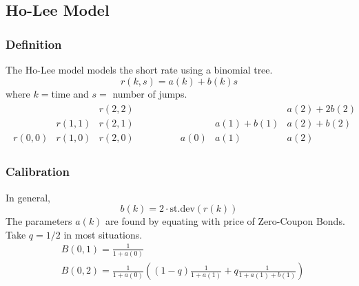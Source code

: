 \documentclass[11pt]{article}
\begin{document}
	\subsection{Ho-Lee Model}
	\subsubsection{Definition}
	The Ho-Lee model models the short rate using a binomial tree. 
	\[	r(k, s) = a(k) + b(k) s
		\]
	where \( k = \)time and \( s =  \) number of jumps. 
	\begin{align*}
		\begin{matrix}
		  	& & r(2,2)\\
			& r(1, 1) & r(2,1)\\
		r(0, 0)	& r(1, 0) & r(2,0)
		\end{matrix}
		\qquad\qquad
		\begin{matrix}
			& & a(2) + 2b(2)\\
			& a(1) + b(1) & a(2) +b(2)\\
			a(0) & a(1) & a(2)
		\end{matrix}
	\end{align*}
	\subsubsection{Calibration}
	In general,
	\[	b(k) = 2\cdot \text{st.dev}(r(k))
		\]
	The parameters \( a(k) \) are found by equating with price of Zero-Coupon Bonds. Take \( q = 1/2 \) in most situations.
	\begin{align*}
			& B(0, 1) = \frac{1}{1+a(0)}\\[3pt]
			& B(0,2) = \frac{1}{1+a(0)}\left((1 - q)\frac{1}{1 + a(1)} + q\frac{1}{1 + a(1) + b(1)}\right)
	\end{align*}
	
\end{document}
